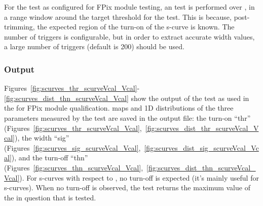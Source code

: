 For the \scurves test as configured for FPix module testing, 
an \scurves test is performed over \vcal, in a \vcal range window around the target threshold for the \trimming test.
This is because, post-trimming, the expected region of the turn-on of the s-curve is known.
The number of triggers is configurable, but in order to extract accurate width values, 
a large number of triggers (default is 200) should be used.

\subsubsection{Output}

Figures~\ref{fig:scurves_thr_scurveVcal_Vcal}-\ref{fig:scurves_dist_thn_scurveVcal_Vcal} 
show the output of the \scurves test as used in the \fulltest for FPix module qualification.
\roc maps and 1D distributions of the three parameters measured by the test are saved in the output file: 
the turn-on ``thr'' (Figures~\ref{fig:scurves_thr_scurveVcal_Vcal},~\ref{fig:scurves_dist_thr_scurveVcal_Vcal}),
the width ``sig'' (Figures~\ref{fig:scurves_sig_scurveVcal_Vcal},~\ref{fig:scurves_dist_sig_scurveVcal_Vcal}),
and the turn-off ``thn'' (Figures~\ref{fig:scurves_thn_scurveVcal_Vcal},~\ref{fig:scurves_dist_thn_scurveVcal_Vcal}).
For s-curves with respect to \vcal, no turn-off is expected (it's mainly useful for \vthrcomp s-curves).
When no turn-off is observed, the test returns the maximum value of the \dac in question that is tested.

